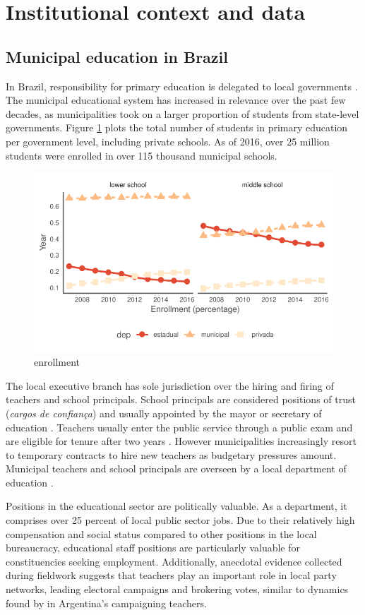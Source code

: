\documentclass[12pt,a4paper]{article}
\begin{document}
\section{Institutional context and data}

\subsection{Municipal education in Brazil}

In Brazil, responsibility for primary education is delegated to local governments \citet{paschoal_historia_2009}. The municipal educational system has increased in relevance over the past few decades, as municipalities took on a larger proportion of students from state-level governments. Figure \ref{fig:enroll} plots the total number of students in primary education per government level, including private schools. As of 2016, over 25 million students were enrolled in over 115 thousand municipal schools.

\begin{figure}[h]
    \centering
    \includegraphics[width=0.6\linewidth]{plots/descriptive_enrollment.pdf}
    \caption{enrollment}
    \label{fig:enroll}
\end{figure}

The local executive branch has sole jurisdiction over the hiring and firing of teachers and school principals. School principals are considered positions of trust (\textit{cargos de confiança}) and usually appointed by the mayor or secretary of education \citet{brollo_victor_2017}. Teachers usually enter the public service through a public exam and are eligible for tenure after two years \citet{gatti_formacao_2010}. However municipalities increasingly resort to temporary contracts to hire new teachers as budgetary pressures amount. Municipal teachers and school principals are overseen by a local department of education \citep{militao_educacao_2014}.

Positions in the educational sector are politically valuable. As a department, it comprises over 25 percent of local public sector jobs. Due to their relatively high compensation and social status compared to other positions in the local bureaucracy, educational staff positions are particularly valuable for constituencies seeking employment. Additionally, anecdotal evidence collected during fieldwork suggests that teachers play an important role in local party networks, leading electoral campaigns and brokering votes, similar to dynamics found by \citet{oliveros_making_2016} in Argentina's campaigning teachers.
\end{document}
